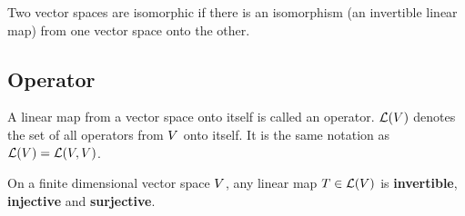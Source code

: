 \documentclass[../../linear_algebra.tex]{subfiles}
\begin{document}
Two vector spaces are isomorphic if there is an isomorphism (an invertible linear map) from one vector space onto the other.


\subsection{Operator}
A linear map from a vector space onto itself is called an operator. $\mathcal{L}(V)$ denotes the set of all operators from $V$ onto itself. It is the same notation as $\mathcal{L}(V) = \mathcal{L}(V, V)$.\newline

On a finite dimensional vector space $V$, any linear map $T \in \mathcal{L}(V)$ is \textbf{invertible}, \textbf{injective} and \textbf{surjective}.
\end{document}
